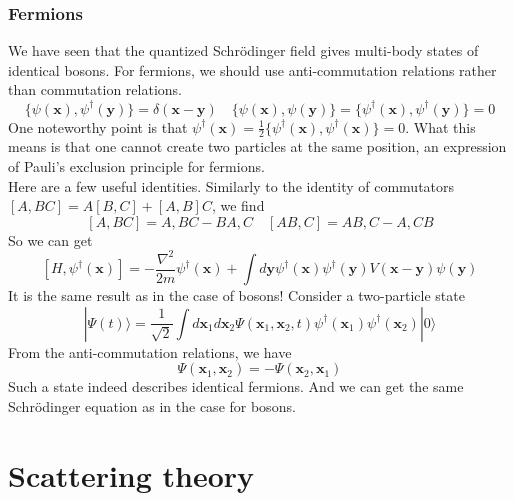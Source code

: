 \subsection{Fermions}
We have seen that the quantized Schrödinger field gives multi-body states of identical bosons. For fermions, we should use anti-commutation relations rather than commutation relations.
\[\{\psi(\bm{x}),\psi^{\dagger}(\bm{y})\} = \delta(\bm{x}-\bm{y}) \quad \{\psi(\bm{x}),\psi(\bm{y})\} = \{\psi^{\dagger}(\bm{x}),\psi^{\dagger}(\bm{y})\} = 0\]
One noteworthy point is that $\psi^{\dagger}(\bm{x}) = \frac{1}{2}\{\psi^{\dagger}(\bm{x}),\psi^{\dagger}(\bm{x})\} = 0$. 
What this means is that one cannot create two particles at the same position, an expression of Pauli's exclusion principle for fermions.\\
Here are a few useful identities. Similarly to the identity of commutators $[A,BC] = A[B,C] + [A,B]C$, we find
\[[A,BC] = {A,B}C - B{A,C} \quad [AB,C] = A{B,C} - {A,C}B\]
So we can get
\[[H,\psi^{\dagger}(\bm{x})] = -\frac{\nabla^2}{2m}\psi^{\dagger}(\bm{x}) + \int d\bm{y} \psi^{\dagger}(\bm{x}) \psi^{\dagger}(\bm{y})V(\bm{x}-\bm{y})\psi(\bm{y})\]
It is the same result as in the case of bosons!
Consider a two-particle state
\[|\Psi(t)\rangle = \frac{1}{\sqrt{2}} \int d\bm{x}_1 d\bm{x}_2 \Psi(\bm{x}_1,\bm{x}_2,t) \psi^{\dagger}(\bm{x}_1)\psi^{\dagger}(\bm{x}_2) |0\rangle\]
From the anti-commutation relations, we have
\[\Psi(\bm{x}_1,\bm{x}_2) = - \Psi(\bm{x}_2,\bm{x}_1)\]
Such a state indeed describes identical fermions. And we can get the same Schrödinger equation as in the case for bosons.

\chapter{Scattering theory}
